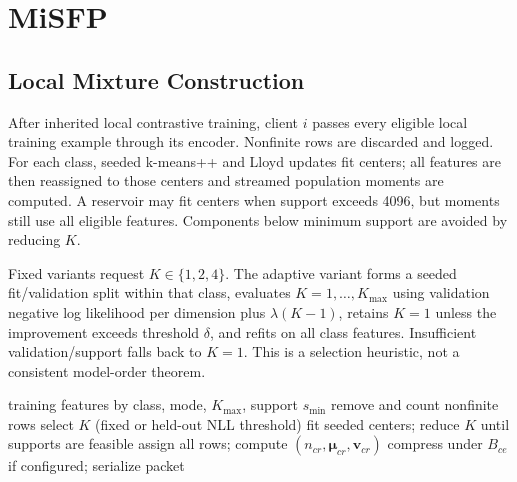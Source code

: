 \section{MiSFP}\label{sec:method}
\subsection{Local Mixture Construction}
After inherited local contrastive training, client $i$ passes every eligible local training example through its encoder. Nonfinite rows are discarded and logged. For each class, seeded k-means++ and Lloyd updates fit centers; all features are then reassigned to those centers and streamed population moments are computed. A reservoir may fit centers when support exceeds 4096, but moments still use all eligible features. Components below minimum support are avoided by reducing $K$.

Fixed variants request $K\in\{1,2,4\}$. The adaptive variant forms a seeded fit/validation split within that class, evaluates $K=1,\ldots,K_{\max}$ using validation negative log likelihood per dimension plus $\lambda(K-1)$, retains $K=1$ unless the improvement exceeds threshold $\delta$, and refits on all class features. Insufficient validation/support falls back to $K=1$. This is a selection heuristic, not a consistent model-order theorem.

\begin{algorithm}[t]
\caption{Client packet construction}\label{alg:client}
\begin{algorithmic}[1]
\Require training features by class, mode, $K_{\max}$, support $s_{\min}$
 \State remove and count nonfinite rows
 \State select $K$ (fixed or held-out NLL threshold)
 \State fit seeded centers; reduce $K$ until supports are feasible
 \State assign all rows; compute $(n_{cr},\bm\mu_{cr},\bm v_{cr})$
\EndFor
\State compress under $B_{ce}$ if configured; serialize packet
\end{algorithmic}
\end{algorithm}

